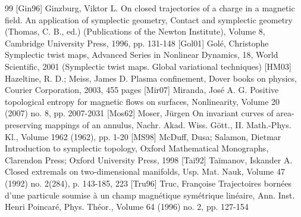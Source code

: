 \documentclass[10pt]{amsart}
\theoremstyle{definition}
\begin{document}
\begin{thebibliography}{99}
 [Gin96] Ginzburg, Viktor L. On closed trajectories of a charge in a magnetic field. An application of symplectic geometry, Contact and symplectic geometry (Thomas, C. B., ed.) (Publications of the Newton Institute), Volume 8, Cambridge University Press, 1996, pp. 131-148
 [Gol01] Golé, Christophe Symplectic twist maps, Advanced Series in Nonlinear Dynamics, 18, World Scientific, 2001 (Symplectic twist maps. Global variational techniques)
 [HM03] Hazeltine, R. D.; Meiss, James D. Plasma confinement, Dover books on physics, Courier Corporation, 2003, 455 pages
 [Mir07] Miranda, José A. G. Positive topological entropy for magnetic flows on surfaces, Nonlinearity, Volume 20 (2007) no. 8, pp. 2007-2031
 [Mos62] Moser, Jürgen On invariant curves of area-preserving mappings of an annulus, Nachr. Akad. Wiss. Gött., II. Math.-Phys. Kl., Volume 1962 (1962), pp. 1-20
 [MS98] McDuff, Dusa; Salamon, Dietmar Introduction to symplectic topology, Oxford Mathematical Monographs, Clarendon Press; Oxford University Press, 1998
 [Taĭ92] Taĭmanov, Iskander A. Closed extremals on two-dimensional manifolds, Usp. Mat. Nauk, Volume 47 (1992) no. 2(284), p. 143-185, 223
 [Tru96] Truc, Françoise Trajectoires bornées d’une particule soumise à un champ magnétique symétrique linéaire, Ann. Inst. Henri Poincaré, Phys. Théor., Volume 64 (1996) no. 2, pp. 127-154
\end{thebibliography}
\end{document}
